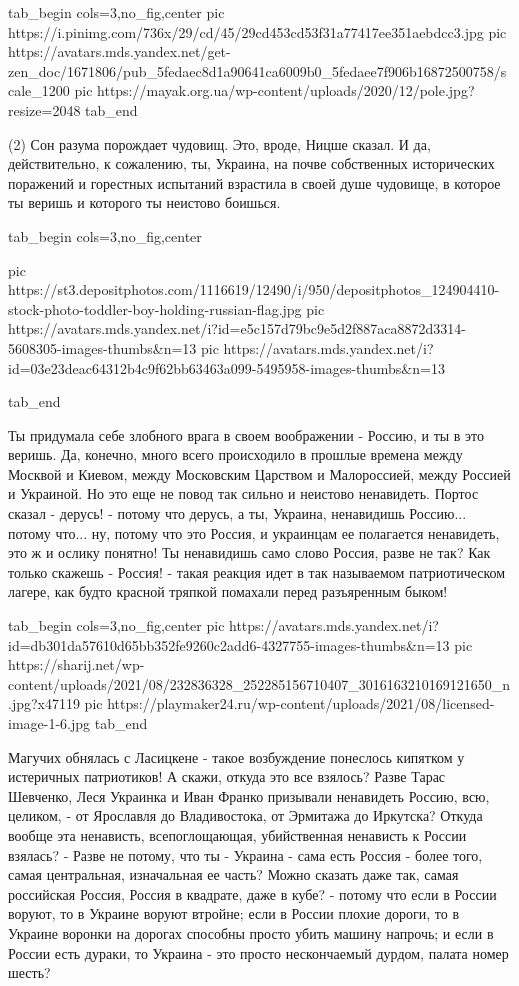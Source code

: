 \ifcmt
  tab_begin cols=3,no_fig,center
     pic https://i.pinimg.com/736x/29/cd/45/29cd453cd53f31a77417ee351aebdcc3.jpg
     pic https://avatars.mds.yandex.net/get-zen_doc/1671806/pub_5fedaec8d1a90641ca6009b0_5fedaee7f906b16872500758/scale_1200
     pic https://mayak.org.ua/wp-content/uploads/2020/12/pole.jpg?resize=2048%
  tab_end
\fi

(2) Сон разума порождает чудовищ. Это, вроде, Ницше сказал. И да,
действительно, к сожалению, ты, Украина, на почве собственных исторических
поражений и горестных испытаний взрастила в своей душе чудовище, в которое ты
веришь и которого ты неистово боишься. 

\ifcmt
  tab_begin cols=3,no_fig,center

     pic https://st3.depositphotos.com/1116619/12490/i/950/depositphotos_124904410-stock-photo-toddler-boy-holding-russian-flag.jpg
     pic https://avatars.mds.yandex.net/i?id=e5c157d79bc9e5d2f887aca8872d3314-5608305-images-thumbs&n=13
     pic https://avatars.mds.yandex.net/i?id=03e23deac64312b4c9f62bb63463a099-5495958-images-thumbs&n=13

  tab_end
\fi

Ты придумала себе злобного врага в своем
воображении - Россию, и ты в это веришь. Да, конечно, много всего происходило в
прошлые времена между Москвой и Киевом, между Московским Царством и
Малороссией, между Россией и Украиной.  Но это еще не повод так сильно и
неистово ненавидеть. Портос сказал - дерусь! - потому что дерусь, а ты,
Украина, ненавидишь Россию... потому что... ну, потому что это Россия, и
украинцам ее полагается ненавидеть, это ж и ослику понятно! Ты ненавидишь само
слово Россия, разве не так? Как только скажешь - Россия! - такая реакция идет в
так называемом патриотическом лагере, как будто красной тряпкой помахали перед
разъяренным быком! 

\ifcmt
  tab_begin cols=3,no_fig,center
     pic https://avatars.mds.yandex.net/i?id=db301da57610d65bb352fe9260c2add6-4327755-images-thumbs&n=13
     pic https://sharij.net/wp-content/uploads/2021/08/232836328_252285156710407_3016163210169121650_n.jpg?x47119
     pic https://playmaker24.ru/wp-content/uploads/2021/08/licensed-image-1-6.jpg
  tab_end
\fi

Магучих обнялась с Ласицкене - такое возбуждение понеслось
кипятком у истеричных патриотиков! А скажи, откуда это все взялось? Разве Тарас
Шевченко, Леся Украинка и Иван Франко призывали ненавидеть Россию, всю,
целиком, - от Ярославля до Владивостока, от Эрмитажа до Иркутска? Откуда вообще
эта ненависть, всепоглощающая, убийственная ненависть к России взялась? - Разве
не потому, что ты - Украина - сама есть Россия - более того, самая центральная,
изначальная ее часть? Можно сказать даже так, самая российская Россия, Россия в
квадрате, даже в кубе? - потому что если в России воруют, то в Украине воруют
втройне; если в России плохие дороги, то в Украине воронки на дорогах способны
просто убить машину напрочь; и если в России есть дураки, то Украина - это
просто нескончаемый дурдом, палата номер шесть?

